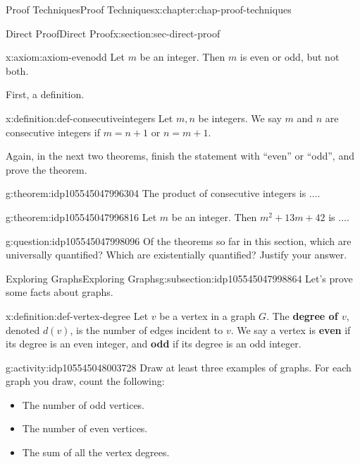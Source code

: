 \documentclass[oneside,10pt,]{book}
\newcommand{\terminology}[1]{\textbf{#1}}
\begin{document}
\begin{chapterptx}{Proof Techniques}{}{Proof Techniques}{}{}{x:chapter:chap-proof-techniques}
\begin{sectionptx}{Direct Proof}{}{Direct Proof}{}{}{x:section:sec-direct-proof}
\begin{axiom}{}{}{x:axiom:axiom-evenodd}%
Let \(m\) be an integer. Then \(m\) is even or odd, but not both.%
\end{axiom}
First, a definition.%
\begin{definition}{}{x:definition:def-consecutiveintegers}%
%
%
Let \(m,n\) be integers. We say \(m\) and \(n\) are consecutive integers if \(m = n+1\) or \(n = m+1\).%
\end{definition}
Again, in the next two theorems, finish the statement with ``even'' or ``odd'', and prove the theorem.%
\begin{theorem}{}{}{g:theorem:idp105545047996304}%
The product of consecutive integers is ....%
\end{theorem}
\begin{theorem}{}{}{g:theorem:idp105545047996816}%
Let \(m\) be an integer. Then \(m^2 + 13m + 42\) is ....%
\end{theorem}
\begin{question}{}{g:question:idp105545047998096}%
Of the theorems so far in this section, which are universally quantified? Which are existentially quantified? Justify your answer.%
\end{question}
%
%
\typeout{************************************************}
\typeout{************************************************}
%
\begin{subsectionptx}{Exploring Graphs}{}{Exploring Graphs}{}{}{g:subsection:idp105545047998864}
Let's prove some facts about graphs.%
\begin{definition}{}{x:definition:def-vertex-degree}%
%
Let \(v\) be a vertex in a graph \(G\). The \terminology{degree of \(v\)}, denoted \(d(v)\), is the number of edges incident to \(v\). We say a vertex is \terminology{even} if its degree is an even integer, and \terminology{odd} if its degree is an odd integer.%
\end{definition}
\begin{activity}{}{g:activity:idp105545048003728}%
Draw at least three examples of graphs. For each graph you draw, count the following:%
%
\begin{itemize}[label=\textbullet]
\item{}The number of odd vertices.%
\item{}The number of even vertices.%
\item{}The sum of all the vertex degrees.%

\end{itemize}
\end{activity}
\end{subsectionptx}
\end{sectionptx}
\end{chapterptx}
\end{document}
